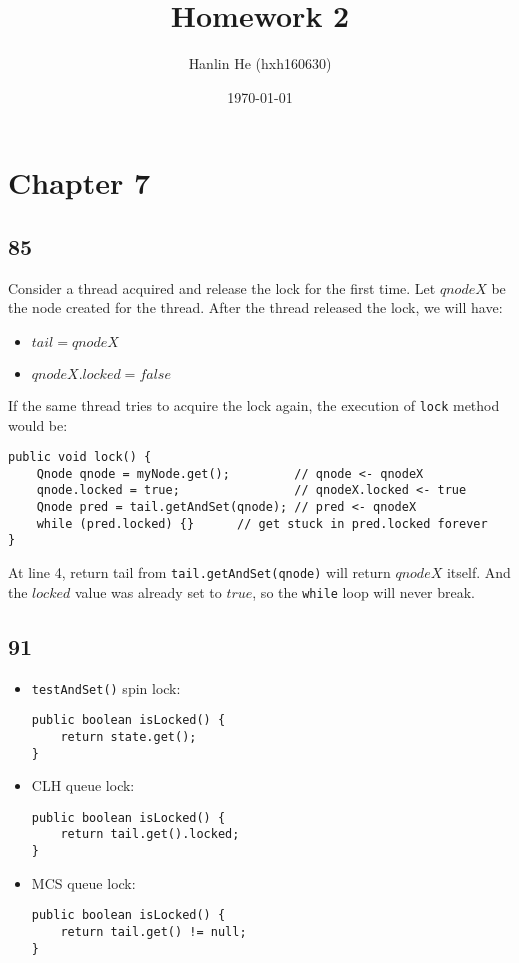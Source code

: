 \documentclass[]{article}
\title{Homework 2}
\author{Hanlin He (hxh160630)}
\date{\today}
\begin{document}
\maketitle

\section*{Chapter 7}

\subsection{85}

Consider a thread acquired and release the lock for the first time. Let $qnodeX$
be the node created for the thread. After the thread released the lock, we will
have:
\begin{itemize}
    \item $tail = qnodeX$
    \item $qnodeX.locked = false$
\end{itemize}
If the same thread tries to acquire the lock again, the execution of
\lstinline{lock} method would be:
\begin{lstlisting}
public void lock() {
    Qnode qnode = myNode.get();         // qnode <- qnodeX
    qnode.locked = true;                // qnodeX.locked <- true
    Qnode pred = tail.getAndSet(qnode); // pred <- qnodeX
    while (pred.locked) {}      // get stuck in pred.locked forever
}
\end{lstlisting}
At line 4, return tail from \lstinline{tail.getAndSet(qnode)} will return $qnodeX$
itself. And the $locked$ value was already set to $ true$, so the
\lstinline{while}
loop will never break.

\subsection{91}

\begin{itemize}
    \item \verb|testAndSet()| spin lock:
\begin{lstlisting}
public boolean isLocked() {
    return state.get();
}
\end{lstlisting}
    \item CLH queue lock:
\begin{lstlisting}
public boolean isLocked() {
    return tail.get().locked;
}
\end{lstlisting}
    \item MCS queue lock:
\begin{lstlisting}
public boolean isLocked() {
    return tail.get() != null;
}
\end{lstlisting}
\end{itemize}
\end{document}
